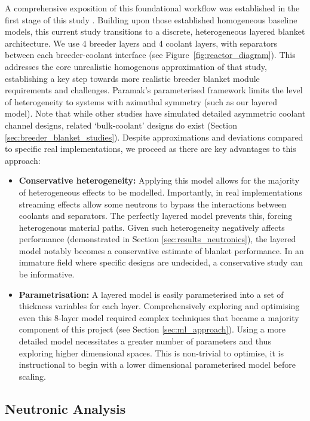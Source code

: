 \documentclass[11pt]{article}
\begin{document}
A comprehensive exposition of this foundational workflow was established in the first stage of this
study \citep{khan_mphys_sem1}. Building upon those established homogeneous baseline models, this
current study transitions to a discrete, heterogeneous layered blanket architecture. We use 4
breeder layers and 4 coolant layers, with separators between each breeder-coolant interface (see
Figure~\ref{fig:reactor_diagram}). This addresses the core unrealistic homogenous approximation of
that study, establishing a key step towards more realistic breeder blanket module requirements and
challenges. Paramak's parameterised framework limits the level of heterogeneity to systems with
azimuthal symmetry (such as our layered model).  Note that while other studies have simulated
detailed asymmetric coolant channel designs, related `bulk-coolant' designs do exist (Section
\ref{sec:breeder_blanket_studies}). Despite approximations and deviations compared to specific real
implementations, we proceed as there are key advantages to this approach:
\begin{itemize}
    \item \textbf{Conservative heterogeneity:} Applying this model allows for the majority of
    heterogeneous effects to be modelled. Importantly, in real implementations streaming effects
    allow some neutrons to bypass the interactions between coolants and separators. The perfectly
    layered model prevents this, forcing heterogenous material paths. Given such heterogeneity
    negatively affects performance (demonstrated in Section \ref{sec:results_neutronics}), the
    layered model notably becomes a conservative estimate of blanket performance. In an immature
    field where specific designs are undecided, a conservative study can be informative.
    \item \textbf{Parametrisation:} A layered model is easily parameterised into a set of thickness
    variables for each layer. Comprehensively exploring and optimising even this 8-layer model
    required complex techniques that became a majority component of this project (see Section
    \ref{sec:ml_approach}). Using a more detailed model necessitates a greater number of parameters
    and thus exploring higher dimensional spaces. This is non-trivial to optimise, it is
    instructional to begin with a lower dimensional parameterised model before scaling.
\end{itemize}

\subsection{Neutronic Analysis}
\label{sec:method_neutronics}
\end{document}
